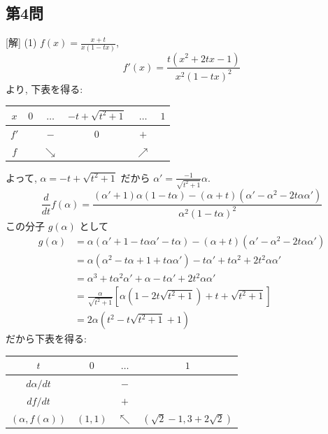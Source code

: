 \documentclass[../main.tex]{subfiles}
\begin{document}
\subsection*{第4問}

[解]
(1) $f(x) = \frac{x+t}{x(1-tx)}$,
\[
  f'(x) = \frac{t(x^2 + 2tx - 1)}{x^2 (1-tx)^2}
\]
より, 下表を得る:

\begin{center}
  \begin{tabular}{c|c|c|c|c|c}
    $x$ & $0$ & $\dots$ & $-t + \sqrt{t^2+1}$ & $\dots$ & $1$ \\ \hline
    $f'$ & & $-$ & $0$ & $+$ & \\ \hline
    $f$ & & $\searrow$ & & $\nearrow$ &
  \end{tabular}
\end{center}

よって, $\alpha = -t + \sqrt{t^2+1}$ だから $\alpha' = \frac{-1}{\sqrt{t^2+1}} \alpha$.
\[
  \frac{d}{dt} f(\alpha) = \frac{(\alpha' + 1) \alpha (1 - t\alpha) - (\alpha + t)(\alpha' - \alpha^2 - 2t\alpha \alpha')}{\alpha^2 (1 - t\alpha)^2}
\]
この分子 $g(\alpha)$ として
\[
  \begin{aligned}
    g(\alpha) &= \alpha (\alpha' + 1 - t\alpha\alpha' - t\alpha) - (\alpha + t)(\alpha' - \alpha^2 - 2t\alpha\alpha') \\
    &= \alpha (\alpha^2 - t\alpha + 1 + t\alpha\alpha') - t\alpha' + t\alpha^2 + 2t^2 \alpha\alpha' \\
    &= \alpha^3 + t\alpha^2\alpha' + \alpha - t\alpha' + 2t^2 \alpha\alpha' \\
    &= \frac{\alpha}{\sqrt{t^2+1}} \left[ \alpha (1 - 2t\sqrt{t^2+1}) + t + \sqrt{t^2+1} \right] \\
    &= 2\alpha \left( t^2 - t\sqrt{t^2+1} + 1 \right)
  \end{aligned}
\]
だから下表を得る:

\begin{center}
  \begin{tabular}{c|c|c|c}
    $t$ & $0$ & $\dots$ & $1$ \\ \hline
    $d\alpha/dt$ & & $-$ & \\ \hline
    $df/dt$ & & $+$ & \\ \hline
    $(\alpha, f(\alpha))$ & $(1, 1)$ & $\nwarrow$ & $(\sqrt{2}-1, 3+2\sqrt{2})$
  \end{tabular}
\end{center}
\end{document}
